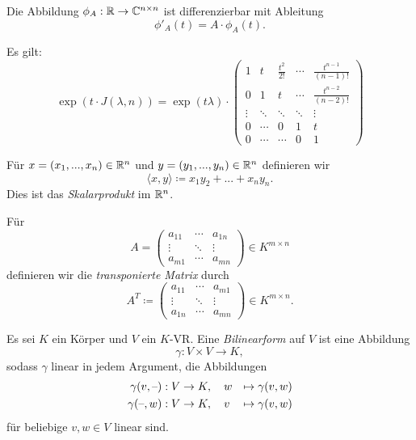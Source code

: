 \documentclass{cheat-sheet}
\begin{document}

\begin{satz}
  Die Abbildung $\phi_A : \mathbb{R} \to \mathbb{C}^{n \times n}$ ist differenzierbar mit Ableitung
  \[ \phi'_A(t) = A \cdot \phi_A(t). \]
\end{satz}


\begin{satz}
  Es gilt:
  \[ \exp(t \cdot J(\lambda, n)) = \exp(t \lambda) \cdot \begin{pmatrix}
  1 & t & \tfrac{t^2}{2!} & \cdots & \tfrac{t^{n-1}}{(n-1)!} \\
  0 & 1 & t & \cdots & \tfrac{t^{n-2}}{(n-2)!} \\
  \vdots & \ddots & \ddots & \ddots & \vdots \\
  0 & \cdots & 0 & 1 & t \\
  0 & \cdots & \cdots & 0 & 1
  \end{pmatrix} \]
\end{satz}


\begin{defn}
  Für $x = (x_1, ..., x_n) \in \mathbb{R}^n$ und $y = (y_1, ..., y_n) \in \mathbb{R}^n$ definieren wir
  \[ \langle x , y \rangle \coloneqq x_1y_2 + ... + x_ny_n. \]
  Dies ist das \emph{Skalarprodukt} im $\mathbb{R}^n$.
\end{defn}

\begin{defn}
  Für
  \[ A = \begin{pmatrix}
  a_{11} & \cdots & a_{1n} \\
  \vdots & \ddots & \vdots \\
  a_{m1} & \cdots & a_{mn}
  \end{pmatrix} \in K^{m \times n} \]
  definieren wir die \emph{transponierte Matrix} durch
  \[ A^{T} \coloneqq \begin{pmatrix}
  a_{11} & \cdots & a_{m1} \\
  \vdots & \ddots & \vdots \\
  a_{1n} & \cdots & a_{mn}
  \end{pmatrix} \in K^{m \times n}. \]
\end{defn}

\begin{defn}
  Es sei $K$ ein Körper und $V$ ein $K$-VR. Eine \emph{Bilinearform} auf $V$ ist eine Abbildung
  \[ \gamma : V \times V \to K, \]
  sodass $\gamma$ linear in jedem Argument, \dh{} die Abbildungen
  \begin{alignat*}{2}
  \gamma(v, \text{--}) &: V \to K, \quad w & \mapsto \gamma(v, w) \\
  \gamma(\text{--}, w) &: V \to K, \quad v & \mapsto \gamma(v, w)
  \end{alignat*}
  für beliebige $v, w \in V$ linear sind.
\end{defn}
\end{document}
